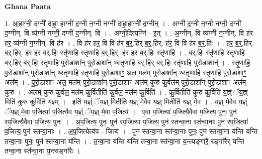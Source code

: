 \documentclass[17pt]{extarticle}
\begin{document}
\textbf{Ghana Paata } \newline

1. आ॒हाग्नी॒ दग्नी॑ दाहा॒ हाग्नी॑ द॒ग्नी न॒ग्नी नग्नी॑ दाहा॒हाग्नी॑ द॒ग्नीन् । . अग्नी॑ द॒ग्नी न॒ग्नी नग्नी॒ दग्नी॑ द॒ग्नीन्. वि व्य॑ग्नी नग्नी॒ दग्नी॑ द॒ग्नीन्. वि । . अग्नी॒दित्यग्नि॑ - इ॒त् । . अ॒ग्नीन्. वि व्य॑ग्नी न॒ग्नीन्. वि ह॑र हर॒ व्य॑ग्नी न॒ग्नीन्. वि ह॑र । . वि ह॑र हर॒ वि वि ह॑र ब॒र्॒.हिर् ब॒र्॒.हिर्. ह॑र॒ वि वि ह॑र ब॒र्॒.हिः । . ह॒र॒ ब॒र्॒.हिर् ब॒र्॒.हिर्. ह॑र हर ब॒र्॒.हिः स्तृ॑णाहि स्तृणाहि ब॒र्॒.हिर्. ह॑र हर ब॒र्॒.हिः स्तृ॑णाहि । . ब॒र्॒.हिः स्तृ॑णाहि स्तृणाहि ब॒र्॒.हिर् ब॒र्॒.हिः स्तृ॑णाहि पुरो॒डाशा᳚न् पुरो॒डाशा᳚न् थ्स्तृणाहि ब॒र्॒.हिर् ब॒र्॒.हिः स्तृ॑णाहि पुरो॒डाशान्॑ । . स्तृ॒णा॒हि॒ पु॒रो॒डाशा᳚न् पुरो॒डाशा᳚न् थ्स्तृणाहि स्तृणाहि पुरो॒डाशाꣳ॒॒ अल॒ मल॑म् पुरो॒डाशा᳚न् थ्स्तृणाहि स्तृणाहि पुरो॒डाशाꣳ॒॒ अल᳚म् । . पु॒रो॒डाशाꣳ॒॒ अल॒ मल॑म् पुरो॒डाशा᳚न् पुरो॒डाशाꣳ॒॒ अल॑म् कुरु कु॒र्वल॑म् पुरो॒डाशा᳚न् पुरो॒डाशाꣳ॒॒ अल॑म् कुरु । . अल॑म् कुरु कु॒र्वल॒ मल॑म् कु॒र्वितीति॑ कु॒र्वल॒ मल॑म् कु॒र्विति॑ । . कु॒र्वितीति॑ कुरु कु॒र्विति॑ य॒ज्ञ्ं ॅय॒ज्ञ् मिति॑ कुरु कु॒र्विति॑ य॒ज्ञ्म् । . इति॑ य॒ज्ञ्ं ॅय॒ज्ञ् मितीति॑ य॒ज्ञ् मे॒वैव य॒ज्ञ् मितीति॑ य॒ज्ञ् मे॒व । . य॒ज्ञ् मे॒वैव य॒ज्ञ्ं ॅय॒ज्ञ् मे॒वा प॒जित्या॑ प॒जित्यै॒व य॒ज्ञ्ं ॅय॒ज्ञ् मे॒वा प॒जित्य॑ । . ए॒वा प॒जित्या॑ प॒जित्यै॒वैवा प॒जित्य॒ पुनः॒ पुन॑ रप॒जित्यै॒वैवा प॒जित्य॒ पुनः॑ । . अ॒प॒जित्य॒ पुनः॒ पुन॑ रप॒जित्या॑ प॒जित्य॒ पुन॑ स्तन्वा॒ना स्त॑न्वा॒नाः पुन॑ रप॒जित्या॑ प॒जित्य॒ पुन॑ स्तन्वा॒नाः । . अ॒प॒जित्येत्य॑प - जित्य॑ । . पुन॑ स्तन्वा॒ना स्त॑न्वा॒नाः पुनः॒ पुन॑ स्तन्वा॒ना य॑न्ति यन्ति तन्वा॒नाः पुनः॒ पुन॑ स्तन्वा॒ना य॑न्ति । . त॒न्वा॒ना य॑न्ति यन्ति तन्वा॒ना स्त॑न्वा॒ना य॒न्त्यङ्गा॑रै॒ रङ्गा॑रैर् यन्ति तन्वा॒ना स्त॑न्वा॒ना य॒न्त्यङ्गा॑रैः । \newline
\end{document}
